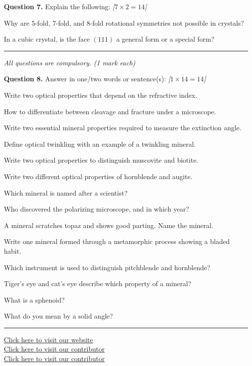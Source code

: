 \documentclass[11pt,a4paper]{article}
\newcommand{\pts}[1]{\hfill   \textit{[#1]}}
\begin{document}
\medskip


\noindent   \textbf{Question 7.} Explain the following: \pts{$7  \times 2 = 14$}

\begin{parts}
  \item Why are 5-fold, 7-fold, and 8-fold rotational symmetries not possible in crystals?
  \item In a cubic crystal, is the face $(111)$ a general form or a special form?
\end{parts}

\bigskip


\rule{\linewidth}{0.4pt}\smallskip



\noindent   \textit{All questions are compulsory. (1 mark each)}
\medskip




\noindent   \textbf{Question 8.} Answer in one/two words or sentence(s): \pts{$1  \times 14 = 14$}

\begin{parts}
  \item Write two optical properties that depend on the refractive index.
  \item How to differentiate between cleavage and fracture under a microscope.
  \item Write two essential mineral properties required to measure the extinction angle.
  \item Define optical twinkling with an example of a twinkling mineral.
  \item Write two optical properties to distinguish muscovite and biotite.
  \item Write two different optical properties of hornblende and augite.
  \item Which mineral is named after a scientist?
  \item Who discovered the polarizing microscope, and in which year?
  \item A mineral scratches topaz and shows good parting. Name the mineral.
  \item Write one mineral formed through a metamorphic process showing a bladed habit.
  \item Which instrument is used to distinguish pitchblende and hornblende?
  \item Tiger's eye and cat's eye describe which property of a mineral?
  \item What is a sphenoid?
  \item What do you mean by a solid angle?
\end{parts}

\vfill\rule{\linewidth}{0.4pt}

\begin{center}\small
\href{https://bhu-exam.vercel.app/}{Click here to visit our website}\\[4pt]
\href{https://me-aryan.vercel.app/}{Click here to visit our contributor}\\[4pt]
\href{https://quashan-me.vercel.app/}{Click here to visit our contributor}
\end{center}
\end{document}
